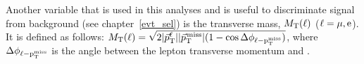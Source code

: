 Another variable that is used in this analyses and is useful to discriminate signal from background (see chapter~\ref{evt_sel}) is the transverse mass, $M_\mathrm{T}(\ell)$ ($\ell = \mu, \text{e}$). It is defined as follows: $ {M_\mathrm{T}}(\ell)=\sqrt{\smash[b]{2|{\vec p}_{\mathrm{T}}^{\ell}||{\vec p}_{\mathrm{T}}^{\kern1pt\text{miss}}|(1-\cos{\Delta \phi_{\ell - \ensuremath{\text{p}_\text{T}^\text{miss}}}})}} $, where $\Delta \phi_{\ell - \text{p}_\text{T}^\text{miss}}$ is the angle between the lepton transverse momentum and \ptvecmiss.


%
% 
% 

%
% 
% 
